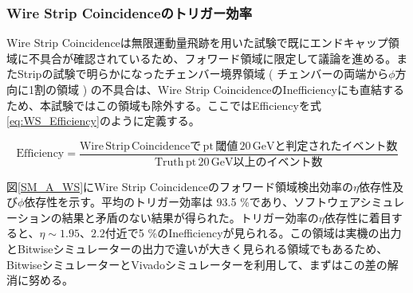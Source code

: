 \subsubsection{Wire Strip Coincidenceのトリガー効率}
Wire Strip Coincidenceは無限運動量飛跡を用いた試験で既にエンドキャップ領域に不具合が確認されているため、フォワード領域に限定して議論を進める。またStripの試験で明らかになったチェンバー境界領域 ( チェンバーの両端から$\phi$方向に1割の領域 ) の不具合は、Wire Strip CoincidenceのInefficiencyにも直結するため、本試験ではこの領域も除外する。ここではEfficiencyを式\ref{eq:WS_Efficiency}のように定義する。

\begin{equation}
    \mathrm {Efficiency} = \frac{\mathrm{Wire\,Strip\, Coincidenceで\,pt \,閾値\,20\,GeVと判定されたイベント数}}{\mathrm{Truth\,pt \,20 \,GeV以上のイベント数}}
    \label{eq:WS_Efficiency}
\end{equation}

図\ref{SM_A_WS}にWire Strip Coincidenceのフォワード領域検出効率の$\eta$依存性及び$\phi$依存性を示す。平均のトリガー効率は 93.5 \%であり、ソフトウェアシミュレーションの結果と矛盾のない結果が得られた。トリガー効率の$\eta$依存性に着目すると、$\eta\sim1.95、2.2$付近で5 \%のInefficiencyが見られる。この領域は実機の出力とBitwiseシミュレーターの出力で違いが大きく見られる領域でもあるため、BitwiseシミュレーターとVivadoシミュレーターを利用して、まずはこの差の解消に努める。

